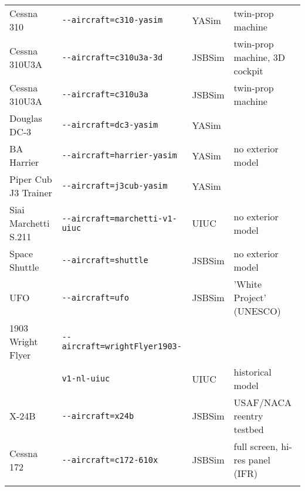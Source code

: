 \begin{tabular}{l|l|l|l}
   Cessna 310					&		\texttt{-$ $-aircraft=c310-yasim}                  
   &  YASim &  twin-prop machine         \\
   Cessna 310U3A &		\texttt{-$ $-aircraft=c310u3a-3d}                  
   & JSBSim &  twin-prop machine, 3D cockpit         \\
   Cessna 310U3A			&		\texttt{-$ $-aircraft=c310u3a}                     
   & JSBSim &  twin-prop machine         \\
   Douglas DC-3	  		&		\texttt{-$ $-aircraft=dc3-yasim}                   
   &  YASim &           \\
   BA Harrier	&		\texttt{-$ $-aircraft=harrier-yasim}               
   &  YASim & no exterior model         \\
   Piper Cub J3 Trainer				&		\texttt{-$ $-aircraft=j3cub-yasim}                 
   &  YASim &           \\
   Siai Marchetti S.211			&		\texttt{-$ $-aircraft=marchetti-v1-uiuc}           
   &  UIUC & no exterior model          \\
   Space Shuttle					&		\texttt{-$ $-aircraft=shuttle}                     
   & JSBSim & no exterior model          \\
   UFO 	&		\texttt{-$ $-aircraft=ufo}               
   & JSBSim & 'White Project' (UNESCO)            \\
   1903 Wright Flyer					&		\texttt{-$ $-aircraft=wrightFlyer1903-}  
   & &          \\
   					&		\texttt{v1-nl-uiuc}  
   & UIUC & historical model          \\
      X-24B	&		\texttt{-$ $-aircraft=x24b}                        
   & JSBSim & USAF/NACA reentry testbed          \\
   Cessna 172  &	\texttt{-$ $-aircraft=c172-610x}         
   & JSBSim & full screen, hi-res panel (IFR)          \\
   \\
\end{tabular}

